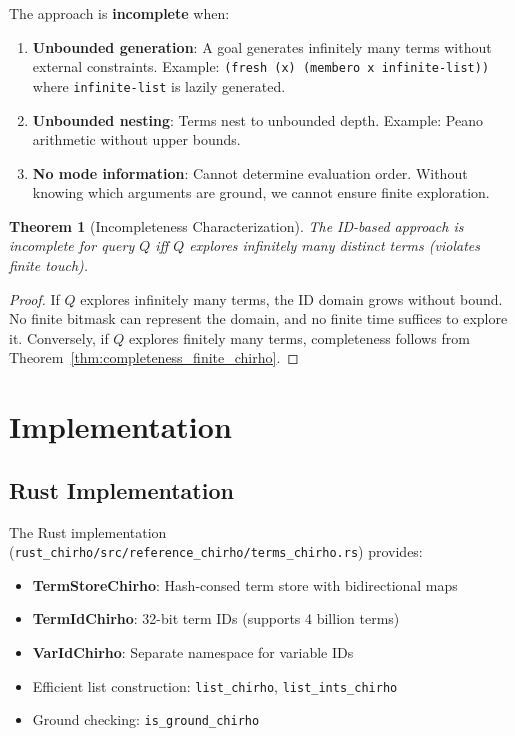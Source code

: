 \documentclass[11pt,a4paper]{article}
\newtheorem{theorem}{Theorem}
\begin{document}
The approach is \textbf{incomplete} when:

\begin{enumerate}
  \item \textbf{Unbounded generation}: A goal generates infinitely many terms
        without external constraints.
        Example: \texttt{(fresh (x) (membero x infinite-list))} where
        \texttt{infinite-list} is lazily generated.

  \item \textbf{Unbounded nesting}: Terms nest to unbounded depth.
        Example: Peano arithmetic without upper bounds.

  \item \textbf{No mode information}: Cannot determine evaluation order.
        Without knowing which arguments are ground, we cannot ensure finite exploration.
\end{enumerate}

\begin{theorem}[Incompleteness Characterization]
\label{thm:incompleteness_chirho}
The ID-based approach is incomplete for query $Q$ iff $Q$ explores infinitely many
distinct terms (violates finite touch).
\end{theorem}

\begin{proof}
If $Q$ explores infinitely many terms, the ID domain grows without bound.
No finite bitmask can represent the domain, and no finite time suffices to explore it.
Conversely, if $Q$ explores finitely many terms, completeness follows from
Theorem~\ref{thm:completeness_finite_chirho}.
\end{proof}

\section{Implementation}
\label{sec:implementation_chirho}

\subsection{Rust Implementation}

The Rust implementation (\texttt{rust\_chirho/src/reference\_chirho/terms\_chirho.rs})
provides:

\begin{itemize}
  \item \textbf{TermStoreChirho}: Hash-consed term store with bidirectional maps
  \item \textbf{TermIdChirho}: 32-bit term IDs (supports 4 billion terms)
  \item \textbf{VarIdChirho}: Separate namespace for variable IDs
  \item Efficient list construction: \texttt{list\_chirho}, \texttt{list\_ints\_chirho}
  \item Ground checking: \texttt{is\_ground\_chirho}
\end{itemize}
\end{document}
